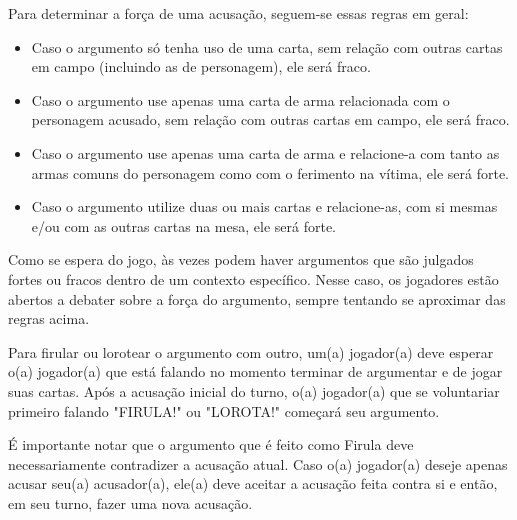 \documentclass[a4paper, 11pt]{article}
\begin{document}
	Para determinar a força de uma acusação, seguem-se essas regras em geral:
	\begin{itemize}
		\item Caso o argumento só tenha uso de uma carta, sem relação com outras cartas em campo (incluindo as de personagem), ele será fraco.

		\item Caso o argumento use apenas uma carta de arma relacionada com o personagem acusado, sem relação com outras cartas em campo, ele será fraco.

		\item Caso o argumento use apenas uma carta de arma e relacione-a com tanto as armas comuns do personagem como com o ferimento na vítima, ele será forte.

		\item Caso o argumento utilize duas ou mais cartas e relacione-as, com si mesmas e/ou com as outras cartas na mesa, ele será forte.
	\end{itemize}

	Como se espera do jogo, às vezes podem haver argumentos que são julgados fortes ou fracos dentro de um contexto específico. Nesse caso, os jogadores estão abertos a debater sobre a força do argumento, sempre tentando se aproximar das regras acima.


	Para firular ou lorotear o argumento com outro, um(a) jogador(a) deve esperar o(a) jogador(a) que está falando no momento terminar de argumentar e de jogar suas cartas. Após a acusação inicial do turno, o(a) jogador(a) que se voluntariar primeiro falando "FIRULA!" ou "LOROTA!" começará seu argumento.

	É importante notar que o argumento que é feito como Firula deve necessariamente contradizer a acusação atual. Caso o(a) jogador(a) deseje apenas acusar seu(a) acusador(a), ele(a) deve aceitar a acusação feita contra si e então, em seu turno, fazer uma nova acusação.

\end{document}
